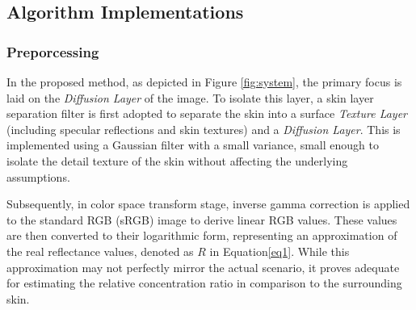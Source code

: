 \begin{spacing}{1.5}
\subsection{Algorithm Implementations}
\subsubsection{Preporcessing}
In the proposed method, as depicted in Figure \ref{fig:system}, the primary focus is laid on the \textit{Diffusion Layer} of the image. To isolate this layer, a skin layer separation filter is first adopted to separate the skin into a surface \textit{Texture Layer} (including specular reflections and skin textures) and a \textit{Diffusion Layer}. This is implemented using a Gaussian filter with a small variance, small enough to isolate the detail texture of the skin without affecting the underlying assumptions. 

Subsequently, in color space transform stage, inverse gamma correction is applied to the standard RGB (sRGB) image to derive linear RGB values. These values are then converted to their logarithmic form, representing an approximation of the real reflectance values, denoted as $R$ in Equation\ref{eq1}. While this approximation may not perfectly mirror the actual scenario, it proves adequate for estimating the relative concentration ratio in comparison to the surrounding skin.

\end{spacing}
